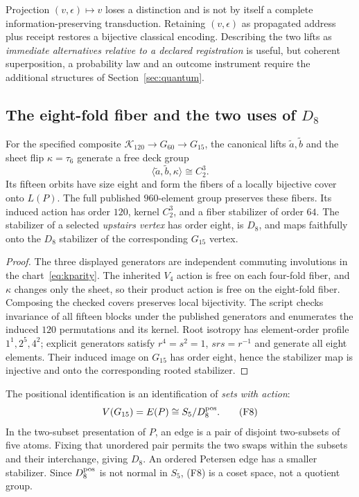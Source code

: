 Projection $(v,\epsilon)\mapsto v$ loses a distinction and is not by itself a complete information-preserving transduction. Retaining $(v,\epsilon)$ as propagated address plus receipt restores a bijective classical encoding. Describing the two lifts as \emph{immediate alternatives relative to a declared registration} is useful, but coherent superposition, a probability law and an outcome instrument require the additional structures of Section~\ref{sec:quantum}.

\subsection*{The eight-fold fiber and the two uses of \texorpdfstring{$D_8$}{D8}}
\begin{proposition}\label{prop:deck8}
For the specified composite $\mathcal K_{120}\to G_{60}\to G_{15}$, the canonical lifts $\widetilde a,\widetilde b$ and the sheet flip $\kappa=\tau_6$ generate a free deck group
\begin{equation}
\langle\widetilde a,\widetilde b,\kappa\rangle\cong C_2^3.
\tag{F7}\label{eq:deck8}
\end{equation}
Its fifteen orbits have size eight and form the fibers of a locally bijective cover onto $L(P)$. The full published $960$-element group preserves these fibers. Its induced action has order $120$, kernel $C_2^3$, and a fiber stabilizer of order $64$. The stabilizer of a selected \emph{upstairs vertex} has order eight, is $D_8$, and maps faithfully onto the $D_8$ stabilizer of the corresponding $G_{15}$ vertex.
\end{proposition}
\begin{proof}
The three displayed generators are independent commuting involutions in the chart~\eqref{eq:kparity}. The inherited $V_4$ action is free on each four-fold fiber, and $\kappa$ changes only the sheet, so their product action is free on the eight-fold fiber. Composing the checked covers preserves local bijectivity. The script checks invariance of all fifteen blocks under the published generators and enumerates the induced $120$ permutations and its kernel. Root isotropy has element-order profile $1^1,2^5,4^2$; explicit generators satisfy $r^4=s^2=1$, $srs=r^{-1}$ and generate all eight elements. Their induced image on $G_{15}$ has order eight, hence the stabilizer map is injective and onto the corresponding rooted stabilizer.
\end{proof}

The positional identification is an identification of \emph{sets with action}:
\begin{equation}
V(G_{15})=E(P)\cong S_5/D_8^{\rm pos}.
\tag{F8}\label{eq:positionalcosets}
\end{equation}
In the two-subset presentation of $P$, an edge is a pair of disjoint two-subsets of five atoms. Fixing that unordered pair permits the two swaps within the subsets and their interchange, giving $D_8$. An ordered Petersen edge has a smaller stabilizer. Since $D_8^{\rm pos}$ is not normal in $S_5$, (F8) is a coset space, not a quotient group.

